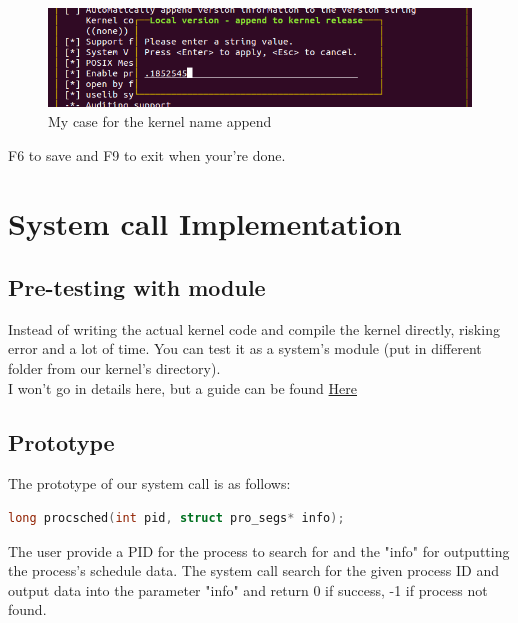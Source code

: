 \documentclass[a4paper]{article}
\begin{document}
\begin{center}
    \begin{figure}[H]
    \begin{center}
     \includegraphics[scale=1]{appendKernelName.png}
    \end{center}
    \caption{My case for the kernel name append}
    \end{figure}
\end{center}
F6 to save and F9 to exit when your're done.
\section{System call Implementation}
\subsection{Pre-testing with module}
Instead of writing the actual kernel code and compile the kernel directly, risking error and a lot of time. You can test it as a system's module (put in different folder from our kernel's directory).\\
I won't go in details here, but a guide can be found \href{http://www.tldp.org/LDP/lkmpg/2.6/html/x40.html}{Here}
\subsection{Prototype}
The prototype of our system call is as follows:
\begin{lstlisting}[language=c]
long procsched(int pid, struct pro_segs* info);
\end{lstlisting}
The user provide a PID for the process to search for and the "info" for outputting the process's schedule data. The system call search for the given process ID and output data into the parameter "info" and return 0 if success, -1 if process not found.
\end{document}
